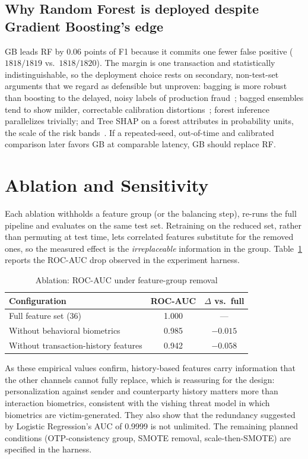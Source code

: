 \documentclass[conference]{IEEEtran}
\newcommand{\tabfont}{\footnotesize}
\begin{document}
\subsection{Why Random Forest is deployed despite Gradient Boosting's edge}
GB leads RF by 0.06 points of F1 because it commits one fewer false positive ($1818/1819$ vs.\ $1818/1820$). The margin is one transaction and statistically indistinguishable, so the deployment choice rests on secondary, non-test-set arguments that we regard as defensible but unproven: bagging is more robust than boosting to the delayed, noisy labels of production fraud~\cite{dietterich00}; bagged ensembles tend to show milder, correctable calibration distortions~\cite{niculescu05}; forest inference parallelizes trivially; and Tree SHAP on a forest attributes in probability units, the scale of the risk bands~\cite{lundberg20}. If a repeated-seed, out-of-time and calibrated comparison later favors GB at comparable latency, GB should replace RF.

\section{Ablation and Sensitivity}
Each ablation withholds a feature group (or the balancing step), re-runs the full pipeline and evaluates on the same test set. Retraining on the reduced set, rather than permuting at test time, lets correlated features substitute for the removed ones, so the measured effect is the \emph{irreplaceable} information in the group. Table~\ref{tab:abl} reports the ROC-AUC drop observed in the experiment harness.

\begin{table}[!t]
\caption{Ablation: ROC-AUC under feature-group removal}\label{tab:abl}
\centering\tabfont
\begin{tabular}{@{}lcc@{}}
\toprule
\textbf{Configuration} & \textbf{ROC-AUC} & \textbf{$\Delta$ vs.\ full}\\
\midrule
Full feature set (36) & 1.000 & ---\\
Without behavioral biometrics & 0.985 & $-0.015$\\
Without transaction-history features & 0.942 & $-0.058$\\
\bottomrule
\end{tabular}
\end{table}

As these empirical values confirm, history-based features carry information that the other channels cannot fully replace, which is reassuring for the design: personalization against sender and counterparty history matters more than interaction biometrics, consistent with the vishing threat model in which biometrics are victim-generated. They also show that the redundancy suggested by Logistic Regression's AUC of 0.9999 is not unlimited. The remaining planned conditions (OTP-consistency group, SMOTE removal, scale-then-SMOTE) are specified in the harness.
\end{document}

